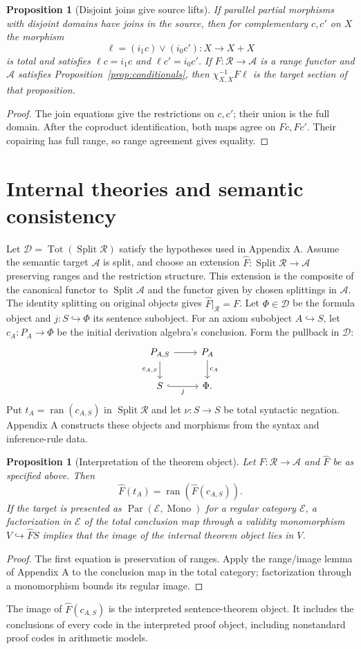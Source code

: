 \documentclass[11pt]{article}
\newtheorem{proposition}[theorem]{Proposition}
\theoremstyle{definition}\newtheorem{definition}[theorem]{Definition}
\newcommand{\Tot}{\operatorname{Tot}}
\newcommand{\Split}{\operatorname{Split}}
\newcommand{\Par}{\operatorname{Par}}
\newcommand{\ran}{\operatorname{ran}}
\newcommand{\R}{\mathscr R}
\newcommand{\A}{\mathcal A}
\newcommand{\D}{\mathcal D}
\newcommand{\E}{\mathcal E}
\begin{document}
\begin{proposition}[Disjoint joins give source lifts]\label{prop:joins}
If parallel partial morphisms with disjoint domains have joins in
the source, then for complementary $c,c'$ on $X$ the morphism
\[
 \ell=(i_1c)\vee(i_0c'):X\to X+X
\]
is total and satisfies $\ell c=i_1c$ and $\ell c'=i_0c'$.
If $F:\R\to\A$ is a range functor and $\A$ satisfies
Proposition~\ref{prop:conditionals}, then
$\chi_{X,X}^{-1}F\ell$ is the target section of that proposition.
\end{proposition}
\begin{proof}
The join equations give the restrictions on $c,c'$; their union
is the full domain. After the coproduct identification, both maps agree on
$Fc,Fc'$. Their copairing has full range, so range agreement gives
equality.
\end{proof}

\section{Internal theories and semantic consistency}
Let $\D=\Tot(\Split\R)$ satisfy the hypotheses used in Appendix A.
Assume the semantic target $\A$ is split, and choose an extension
$\widehat F:\Split\R\to\A$ preserving ranges and the restriction
structure. This extension is the composite of the canonical functor
to $\Split\A$ and the functor given by chosen splittings in $\A$.
The identity splitting on original objects gives
$\widehat F|_{\R}=F$.
Let $\Phi\in\D$ be the formula object and $j:S\hookrightarrow\Phi$
its sentence subobject. For an axiom subobject $A\hookrightarrow S$,
let $c_A:P_A\to\Phi$ be the initial derivation algebra's conclusion.
Form the pullback in $\D$:
\[
\begin{tikzcd}
 P_{A,S}\arrow[r]\arrow[d,"c_{A,S}"']&P_A\arrow[d,"c_A"]\\
 S\arrow[r,hook,"j"']&\Phi.
\end{tikzcd}
\]
Put $t_A=\ran(c_{A,S})$ in $\Split\R$ and let
$\nu:S\to S$ be total syntactic negation. Appendix A constructs
these objects and morphisms from the syntax and inference-rule data.

\begin{proposition}[Interpretation of the theorem object]\label{prop:image}
Let $F:\R\to\A$ and $\widehat F$ be as specified above. Then
\[
 \widehat F(t_A)=\ran(\widehat F(c_{A,S})).
\]
If the target is presented as $\Par(\E,\operatorname{Mono})$ for
a regular category $\E$, a factorization in $\E$ of the total
conclusion map through a validity monomorphism $V\hookrightarrow
\widehat F S$ implies that the image of the internal theorem object
lies in $V$.
\end{proposition}
\begin{proof}
The first equation is preservation of ranges. Apply the range/image
lemma of Appendix A to the conclusion map in the total category;
factorization through a monomorphism bounds its regular image.
\end{proof}
The image of $\widehat F(c_{A,S})$ is the interpreted sentence-theorem
object. It includes the conclusions of every code in the interpreted
proof object, including nonstandard proof codes in arithmetic models.
\end{document}

